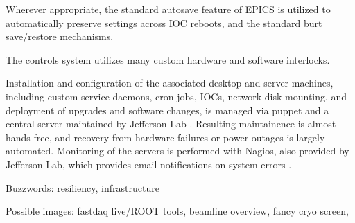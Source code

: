 Wherever appropriate, the standard autosave feature of EPICS is utilized to automatically preserve settings across IOC reboots, and the standard burt save/restore mechanisms.

The controls system utilizes many custom hardware and software interlocks.

Installation and configuration of the associated desktop and server machines, including custom service daemons, cron jobs, IOCs, network disk mounting, and deployment of upgrades and software changes, is managed via puppet and a central server maintained by Jefferson Lab \cite{puppet-website}.  Resulting maintainence is almost hands-free, and recovery from hardware failures or power outages is largely automated.  Monitoring of the servers is performed with Nagios, also provided by Jefferson Lab, which provides email notifications on system errors \cite{nagios-website}.


Buzzwords:  resiliency, infrastructure

Possible images:  fastdaq live/ROOT tools, beamline overview, fancy cryo screen, 

